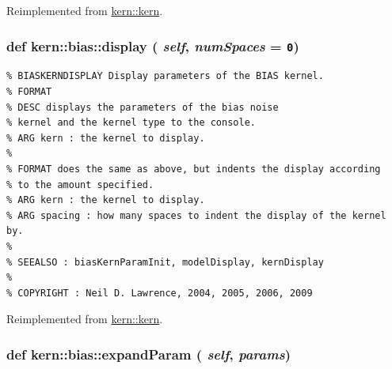 Reimplemented from \hyperlink{classkern_1_1kern}{kern::kern}.\hypertarget{classkern_1_1bias_c1b8e81b9b0942aa0dbe393f8069f0d6}{
\subsubsection[{display}]{\setlength{\rightskip}{0pt plus 5cm}def kern::bias::display ( {\em self}, \/   {\em numSpaces} = {\tt 0})}}
\label{classkern_1_1bias_c1b8e81b9b0942aa0dbe393f8069f0d6}




\footnotesize\begin{verbatim}% BIASKERNDISPLAY Display parameters of the BIAS kernel.
% FORMAT
% DESC displays the parameters of the bias noise
% kernel and the kernel type to the console.
% ARG kern : the kernel to display.
%
% FORMAT does the same as above, but indents the display according
% to the amount specified.
% ARG kern : the kernel to display.
% ARG spacing : how many spaces to indent the display of the kernel by.
%
% SEEALSO : biasKernParamInit, modelDisplay, kernDisplay
%
% COPYRIGHT : Neil D. Lawrence, 2004, 2005, 2006, 2009

\end{verbatim}
\normalsize
 

Reimplemented from \hyperlink{classkern_1_1kern}{kern::kern}.\hypertarget{classkern_1_1bias_9a869f2def84ada0aee7698139c31ea2}{
\subsubsection[{expandParam}]{\setlength{\rightskip}{0pt plus 5cm}def kern::bias::expandParam ( {\em self}, \/   {\em params})}}
\label{classkern_1_1bias_9a869f2def84ada0aee7698139c31ea2}




